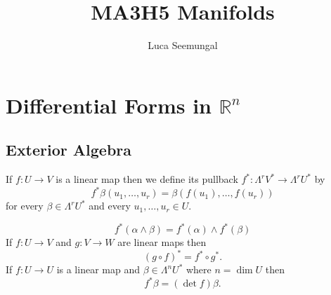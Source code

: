 \documentclass[a4paper]{article}
\title{MA3H5 Manifolds}
\author{Luca Seemungal}
\newcommand{\R}{\mathbb{R}}
\newcommand{\<}{\langle}
\renewcommand{\>}{\rangle}
\renewcommand{\a}{\alpha}
\renewcommand{\b}{\beta}
\newcommand{\La}{\Lambda}
\newcommand{\w}{\wedge}
\begin{document}
\maketitle
\tableofcontents

\section{Differential Forms in $\R^n$}

\subsection{Exterior Algebra}

If $f:U\to V$ is a linear map then we define its pullback $f^*:\La^rV^*\to\La^rU^*$ by
$$f^*\b(u_1,\ldots,u_r) = \b(f(u_1),\ldots,f(u_r))$$
for every $\b\in\La^r U^*$ and every $u_1,\ldots,u_r\in U$.

\begin{prop}
  $$f^*(\a\w\b) = f^*(\a)\w f^*(\b)$$
  If $f:U\to V$ and $g:V\to W$ are linear maps then
  $$(g\circ f)^* = f^*\circ g^*.$$
  If $f:U\to U$ is a linear map and $\b\in\La^n U^*$ where $n=\dim U$ then 
  $$f^*\b = (\det f)\b.$$
\end{prop}
\end{document}
